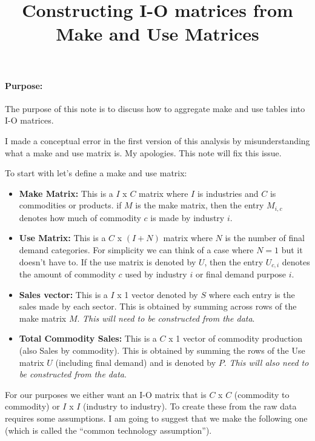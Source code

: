 \documentclass[12pt,english]{article}
\begin{document}


\title{Constructing I-O matrices from Make and Use Matrices}
\maketitle

\paragraph{Purpose:} The purpose of this note is to discuss how to aggregate make and use tables into I-O matrices.

I made a conceptual error in the first version of this analysis by misunderstanding what a make and use matrix is. My apologies. This note will fix this issue.

To start with let's define a make and use matrix:

\begin{itemize}
	\item {\bf Make Matrix:} This is a $I$ x $C$ matrix where $I$ is industries and $C$ is commodities or products. if $M$ is the make matrix, then the entry $M_{i,c}$ denotes how much of commodity $c$ is made by industry $i$.
	\item {\bf Use Matrix:} This is a $C$ x $(I+N)$ matrix where $N$ is the number of final demand categories. For simplicity we can think of a case where $N=1$ but it doesn't have to. If the use matrix is denoted by $U$, then the entry $U_{c,i}$ denotes the amount of commodity $c$ used by industry $i$ or final demand purpose $i$.
	\item {\bf Sales vector:} This is a $I$ x 1 vector denoted by $S$ where each entry is the sales made by each sector.  This is obtained by summing across rows of the make matrix $M$. \emph{This will need to be constructed from the data}.
	\item {\bf Total Commodity Sales:} This is a $C$ x 1 vector of commodity production (also Sales by commodity). This is obtained by summing the rows of the Use matrix $U$ (including final demand) and is denoted by $P$. \emph{This will also need to be constructed from the data}.
\end{itemize}

For our purposes we either want an I-O matrix that is $C$ x $C$ (commodity to commodity) or $I$ x $I$ (industry to industry). To create these from the raw data requires some assumptions. I am going to suggest that we make the following one (which is called the ``common technology assumption''). 
\end{document}
